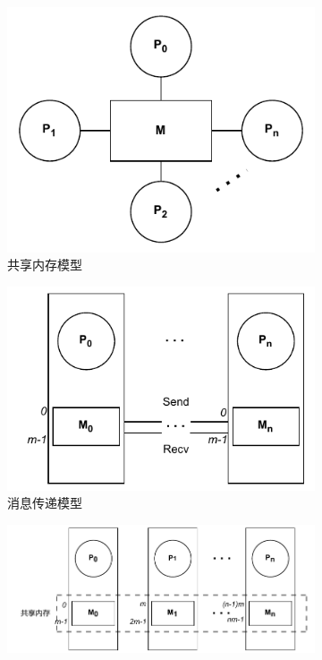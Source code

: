 {  \begin{figure}[!htbp]
    \centering
    \begin{subfigure}[b]{0.35\textwidth}
      \includegraphics[width=\textwidth]{Img/共享内存模型.drawio.pdf}
      \caption{共享内存模型}
      \label{fig:multi-core}
    \end{subfigure}%
    \hspace{1.5cm}
    \begin{subfigure}[b]{0.35\textwidth}
      \includegraphics[width=\textwidth]{Img/消息传递模型.drawio.pdf}
      \caption{消息传递模型}
      \label{fig:message-passing}
    \end{subfigure}
    \begin{subfigure}[b]{0.6\textwidth}
      \includegraphics[width=\textwidth]{Img/分布式共享内存模型.drawio.pdf}

\end{subfigure}
\end{figure}}
